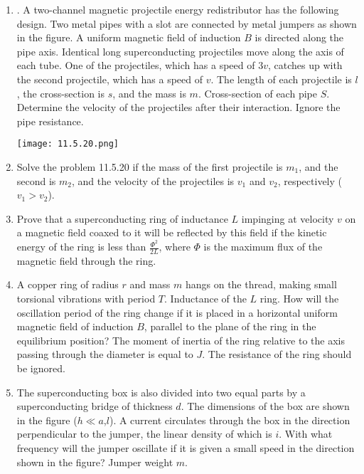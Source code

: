 \documentclass{article}
\begin{document}
\begin{enumerate}[label=11.5.\arabic*]
\item. A two-channel magnetic projectile energy redistributor has the following design. Two metal pipes with a slot are connected by metal jumpers as shown in the figure. A uniform magnetic field of induction $B$ is directed along the pipe axis. Identical long superconducting projectiles move along the axis of each tube. One of the projectiles, which has a speed of $3v$, catches up with the second projectile, which has a speed of $v$. The length of each projectile is $l$, the cross-section is $s$, and the mass is $m$. Cross-section of each pipe $S$. Determine the velocity of the projectiles after their interaction. Ignore the pipe resistance.

\begin{center}
    \texttt{[image: 11.5.20.png]}
\end{center}


\item Solve the problem 11.5.20 if the mass of the first projectile is $m_1$, and the second is $m_2$, and the velocity of the projectiles is $v_1$ and $v_2$, respectively ($v_1 > v_2$).

\item Prove that a superconducting ring of inductance $L$ impinging at velocity $v$ on a magnetic field coaxed to it will be reflected by this field if the kinetic energy of the ring is less than $\frac{\Phi^2}{2L}$, where $\Phi$ is the maximum flux of the magnetic field through the ring.

\item A copper ring of radius $r$ and mass $m$ hangs on the thread, making small torsional vibrations with period $T$. Inductance of the $L$ ring. How will the oscillation period of the ring change if it is placed in a horizontal uniform magnetic field of induction $B$, parallel to the plane of the ring in the equilibrium position? The moment of inertia of the ring relative to the axis passing through the diameter is equal to $J$. The resistance of the ring should be ignored.

\item The superconducting box is also divided into two equal parts by a superconducting bridge of thickness $d$. The dimensions of the box are shown in the figure ($h \ll a$,$l$). A current circulates through the box in the direction perpendicular to the jumper, the linear density of which is $i$. With what frequency will the jumper oscillate if it is given a small speed in the direction shown in the figure? Jumper weight $m$.


\end{enumerate}
\end{document}
